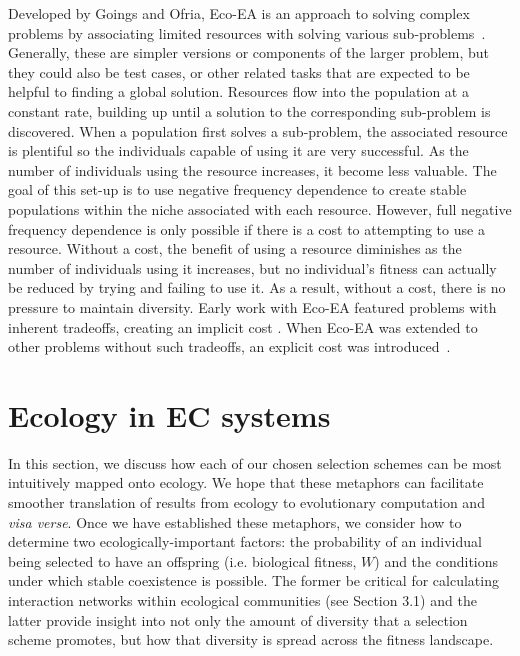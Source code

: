 Developed by Goings and Ofria, Eco-EA is an approach to solving complex problems by associating limited resources with solving various sub-problems~\cite{goings_ecological_2009,goings_natural_2010,goings_ecology-based_2012}. Generally, these are simpler versions or components of the larger problem, but they could also be test cases, or other related tasks that are expected to be helpful to finding a global solution. Resources flow into the population at a constant rate, building up until a solution to the corresponding sub-problem is discovered. When a population first solves a sub-problem, the associated resource is plentiful so the individuals capable of using it are very successful. As the number of individuals using the resource increases, it become less valuable. The goal of this set-up is to use negative frequency dependence to create stable populations within the niche associated with each resource. However, full negative frequency dependence is only possible if there is a cost to attempting to use a resource. Without a cost, the benefit of using a resource diminishes as the number of individuals using it increases, but no individual's fitness can actually be reduced by trying and failing to use it. As a result, without a cost, there is no pressure to maintain diversity. Early work with Eco-EA featured problems with inherent tradeoffs, creating an implicit cost \cite{goings_ecological_2009,goings_ecology-based_2012}. When Eco-EA was extended to other problems without such tradeoffs, an explicit cost was introduced~\cite{dolson_applying_2018}.


\section{Ecology in EC systems}

In this section, we discuss how each of our chosen selection schemes can be most intuitively mapped onto ecology. We hope that these metaphors can facilitate smoother translation of results from ecology to evolutionary computation and \textit{visa verse}. Once we have established these metaphors, we consider how to determine two ecologically-important factors: the probability of an individual being selected to have an offspring (i.e. biological fitness, $W$) and the conditions under which stable coexistence is possible. The former be critical for calculating interaction networks within ecological communities (see Section 3.1) and the latter provide insight into not only the amount of diversity that a selection scheme promotes, but how that diversity is spread across the fitness landscape.

